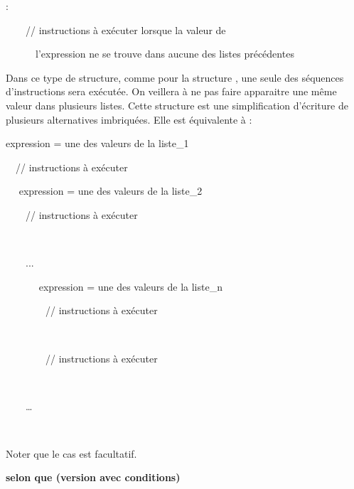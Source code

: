 \bigskip

{\sffamily
{} : }

{\sffamily
\ \ \ \ // instructions à exécuter lorsque la valeur de}

{\sffamily
\ \ \ \ \ \ l’expression ne se trouve dans aucune des listes
précédentes}

{\sffamily
{} }

{
Dans ce type de structure, comme pour la structure
, une seule des séquences d’instructions
sera exécutée. On veillera à ne pas faire apparaitre une même valeur
dans plusieurs listes. Cette structure est une simplification
d’écriture de plusieurs alternatives imbriquées. Elle est équivalente à
:}

{\sffamily
{} expression = une des valeurs de la liste\_1
}

{\sffamily
\ \ // instructions à exécuter}

{\sffamily
{}}

{\sffamily
\ \  expression = une des valeurs de la liste\_2
}

{\sffamily
\ \ \ \ // instructions à exécuter}

{\sffamily
\ \ }

{\sffamily
\ \ \ \ ...}

{\sffamily
\ \ \ \ \ \  expression = une des valeurs de la
liste\_n }

{\sffamily
\ \ \ \ \ \ \ \ // instructions à exécuter}

{\sffamily
\ \ \ \ \ \ }

{\sffamily
\ \ \ \ \ \ \ \ // instructions à exécuter}

{\sffamily
\ \ \ \ \ \ }

{\sffamily
\ \ \ \ …}

{\sffamily
\ \ }

{\sffamily
{}}

{
Noter que le cas  est facultatif.}


\bigskip


\bigskip

{\sffamily\bfseries
selon que (version avec conditions)}

{\sffamily
{} }


